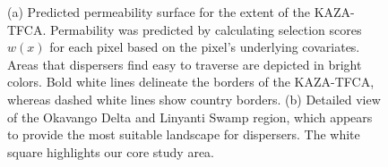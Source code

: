 \documentclass[abstract=on,10pt,a4paper,bibliography=totocnumbered]{scrartcl}
\begin{document}
\begin{figure}[hbtp]
  \begin{center}
    \caption{(a) Predicted permeability surface for the extent of the KAZA-TFCA.
    Permability was predicted by calculating selection scores \(w(x)\) for each
    pixel based on the pixel's underlying covariates. Areas that dispersers find
    easy to traverse are depicted in bright colors. Bold white lines delineate
    the borders of the KAZA-TFCA, whereas dashed white lines show country
    borders. (b) Detailed view of the Okavango Delta and Linyanti Swamp region,
    which appears to provide the most suitable landscape for dispersers. The
    white square highlights our core study area.}
    \label{PermeabilityMap}
  \end{center}
\end{figure}
\restoregeometry
\end{document}
